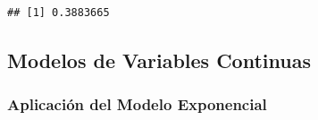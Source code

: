 \documentclass[
]{article}
\begin{document}
\begin{verbatim}
## [1] 0.3883665
\end{verbatim}

\hypertarget{modelos-de-variables-continuas}{%
\subsection{\texorpdfstring{\textbf{Modelos de Variables
Continuas}}{Modelos de Variables Continuas}}\label{modelos-de-variables-continuas}}

\hypertarget{aplicaciuxf3n-del-modelo-exponencial}{%
\subsubsection{\texorpdfstring{\textbf{Aplicación del Modelo
Exponencial}}{Aplicación del Modelo Exponencial}}\label{aplicaciuxf3n-del-modelo-exponencial}}
\end{document}
